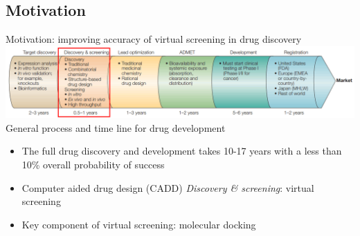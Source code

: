\subsection{Motivation}
\begin{frame}[c]{Motivation: improving accuracy of virtual screening in drug discovery}
\includegraphics[width = \textwidth]{../figures/pipeline_1.png}\\
 {\centering \scriptsize General process and time line for drug development \footnotemark[1]}
\begin{itemize}
    \item The full drug discovery and development takes 10-17 years with a less than 10\% overall probability of success
    \item Computer aided drug design (CADD) \textit{Discovery \& screening}: virtual screening
    \item Key component of virtual screening: molecular docking
    \end{itemize}
\end{frame}


